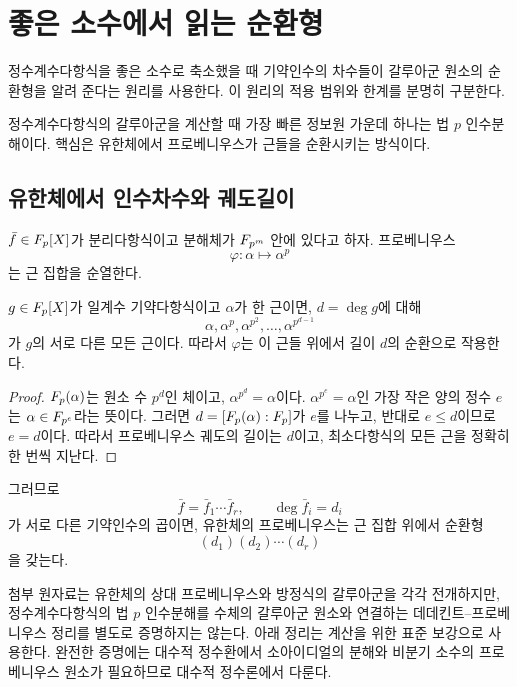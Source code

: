 \clearpage
\section{좋은 소수에서 읽는 순환형}
\label{sec:frobenius-cycle-types}

\begin{learninggoal}
정수계수다항식을 좋은 소수로 축소했을 때 기약인수의 차수들이 갈루아군 원소의 순환형을 알려 준다는 원리를 사용한다. 이 원리의 적용 범위와 한계를 분명히 구분한다.
\end{learninggoal}

정수계수다항식의 갈루아군을 계산할 때 가장 빠른 정보원 가운데 하나는 법 $p$ 인수분해이다. 핵심은 유한체에서 프로베니우스가 근들을 순환시키는 방식이다.

\subsection{유한체에서 인수차수와 궤도길이}

$\bar f\in F_p[X]$가 분리다항식이고 분해체가 $F_{p^m}$ 안에 있다고 하자. 프로베니우스
\[
  \varphi:\alpha\longmapsto\alpha^p
\]
는 근 집합을 순열한다.

\begin{proposition}
\label{prop:finite-field-factor-cycle}
$g\in F_p[X]$가 일계수 기약다항식이고 $\alpha$가 한 근이면, $d=\deg g$에 대해
\[
  \alpha,\alpha^p,\alpha^{p^2},\dots,
  \alpha^{p^{d-1}}
\]
가 $g$의 서로 다른 모든 근이다. 따라서 $\varphi$는 이 근들 위에서 길이 $d$의 순환으로 작용한다.
\end{proposition}

\begin{proof}
$F_p(\alpha)$는 원소 수 $p^d$인 체이고, $\alpha^{p^d}=\alpha$이다. $\alpha^{p^e}=\alpha$인 가장 작은 양의 정수 $e$는 $\alpha\in F_{p^e}$라는 뜻이다. 그러면 $d=[F_p(\alpha):F_p]$가 $e$를 나누고, 반대로 $e\le d$이므로 $e=d$이다. 따라서 프로베니우스 궤도의 길이는 $d$이고, 최소다항식의 모든 근을 정확히 한 번씩 지난다.
\end{proof}

그러므로
\[
  \bar f=\bar f_1\cdots\bar f_r,
  \qquad
  \deg\bar f_i=d_i
\]
가 서로 다른 기약인수의 곱이면, 유한체의 프로베니우스는 근 집합 위에서 순환형
\[
  (d_1)(d_2)\cdots(d_r)
\]
을 갖는다.

\begin{remark}[자료 범위와 보강]
첨부 원자료는 유한체의 상대 프로베니우스와 방정식의 갈루아군을 각각 전개하지만, 정수계수다항식의 법 $p$ 인수분해를 수체의 갈루아군 원소와 연결하는 데데킨트--프로베니우스 정리를 별도로 증명하지는 않는다. 아래 정리는 계산을 위한 표준 보강으로 사용한다. 완전한 증명에는 대수적 정수환에서 소아이디얼의 분해와 비분기 소수의 프로베니우스 원소가 필요하므로 대수적 정수론에서 다룬다.
\end{remark}

